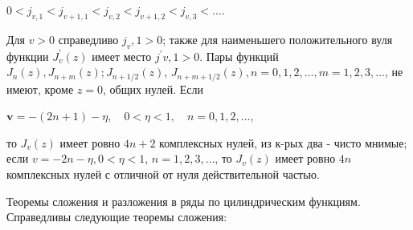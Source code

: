 \documentclass[10pt]{article}
\begin{document}
$0<j_{v, 1}<j_{v+1,1}<j_{v, 2}<j_{v+1,2}<j_{v, 3}<\ldots$.



Для $v>0$ справедливо $j_{v}, 1>0$; также для наименьшего положительного вуля функции $J_{v}^{\prime}(z)$ имеет место $j^{\prime} v, 1>0$. Пары функций $J_{n}(z), J_{n+m}(z) ; J_{n+1 / 2}(z)$, $J_{n+m+1 / 2}(z), n=0,1,2, \ldots, m=1,2,3, \ldots$, не имеют, кроме $z=0$, общих нулей. Если



$\boldsymbol{v}=-(2 n+1)-\eta, \quad 0<\eta<1, \quad n=0,1,2, \ldots$,



то $J_{v}(z)$ имеет ровно $4 n+2$ комплексных нулей, из к-рых два - чисто мнимые; если $v=-2 n-\eta, 0<\eta<1$, $n=1,2,3, \ldots$, то $J_{v}(z)$ имеет ровно $4 n$ комплексных нулей с отличной от нуля действительной частью.



Теоремы сложения и разложения в ряды по цилиндрическим функциям. Справедливы следующие теоремы сложения:
\end{document}
